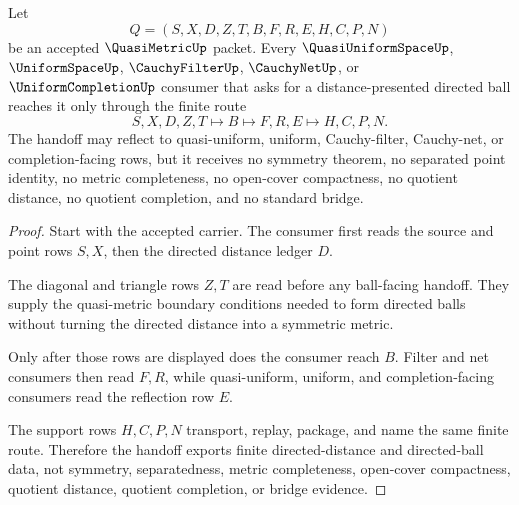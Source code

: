 \begin{theorem}
\label{thm:quasi-metric-directed-ball-handoff}
Let
$$
Q=(S,X,D,Z,T,B,F,R,E,H,C,P,N)
$$
be an accepted $\QuasiMetricUp$ packet. Every $\QuasiUniformSpaceUp$, $\UniformSpaceUp$, $\CauchyFilterUp$, $\CauchyNetUp$, or $\UniformCompletionUp$ consumer that asks for a distance-presented directed ball reaches it only through the finite route
$$
S,X,D,Z,T \longmapsto B \longmapsto F,R,E \longmapsto H,C,P,N .
$$
The handoff may reflect to quasi-uniform, uniform, Cauchy-filter, Cauchy-net, or completion-facing rows, but it receives no symmetry theorem, no separated point identity, no metric completeness, no open-cover compactness, no quotient distance, no quotient completion, and no standard bridge.
\end{theorem}
\begin{proof}
Start with the accepted carrier. The consumer first reads the source and point rows $S,X$, then the directed distance ledger $D$.

The diagonal and triangle rows $Z,T$ are read before any ball-facing handoff. They supply the quasi-metric boundary conditions needed to form directed balls without turning the directed distance into a symmetric metric.

Only after those rows are displayed does the consumer reach $B$. Filter and net consumers then read $F,R$, while quasi-uniform, uniform, and completion-facing consumers read the reflection row $E$.

The support rows $H,C,P,N$ transport, replay, package, and name the same finite route. Therefore the handoff exports finite directed-distance and directed-ball data, not symmetry, separatedness, metric completeness, open-cover compactness, quotient distance, quotient completion, or bridge evidence.
\end{proof}

